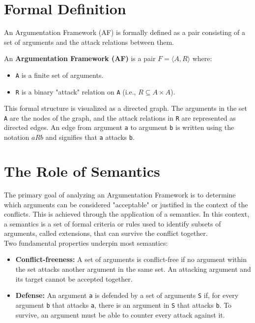 \documentclass{scrbook}
\begin{document}
\section{Formal Definition}

An Argumentation Framework (AF) is formally defined as a pair consisting of a set of arguments and the attack relations between them.

An \textbf{Argumentation Framework (AF)} is a pair \texttt{$F = ⟨A, R⟩$} where:

\begin{itemize}
    \item 
    \texttt{A} is a finite set of arguments.

    \item 
    \texttt{R} is a binary "attack" relation on \texttt{A} (i.e., \texttt{$R \subseteq A \times A$}).
\end{itemize}

This formal structure is visualized as a directed graph. The arguments in the set \texttt{A} are the nodes of the graph, and the attack relations in \texttt{R} are represented as directed edges. An edge from argument \texttt{a} to argument \texttt{b} is written using the notation $aRb$ and signifies that \texttt{a} attacks \texttt{b}.

\section{The Role of Semantics}

The primary goal of analyzing an Argumentation Framework is to determine which arguments can be considered "acceptable" or justified in the context of the conflicts. This is achieved through the application of a semantics. In this context, a semantics is a set of formal criteria or rules used to identify subsets of arguments, called extensions, that can survive the conflict together. \\

Two fundamental properties underpin most semantics:

\begin{itemize}
    \item 
    \textbf{Conflict-freeness:} A set of arguments is conflict-free if no argument within the set attacks another argument in the same set. An attacking argument and its target cannot be accepted together.

    \item 
    \textbf{Defense:} An argument \texttt{a} is defended by a set of arguments \texttt{S} if, for every argument \texttt{b} that attacks \texttt{a}, there is an argument in \texttt{S} that attacks \texttt{b}. To survive, an argument must be able to counter every attack against it.
\end{itemize}
\end{document}
